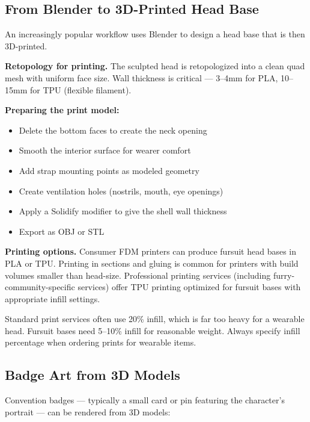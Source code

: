 \subsection{From Blender to 3D-Printed Head Base}

An increasingly popular workflow uses Blender to design a head base that is then 3D-printed.

\textbf{Retopology for printing.} The sculpted head is retopologized into a clean quad mesh with uniform face size. Wall thickness is critical --- 3--4mm for PLA, 10--15mm for TPU (flexible filament).

\textbf{Preparing the print model:}

\begin{itemize}[leftmargin=2em]
  \item Delete the bottom faces to create the neck opening
  \item Smooth the interior surface for wearer comfort
  \item Add strap mounting points as modeled geometry
  \item Create ventilation holes (nostrils, mouth, eye openings)
  \item Apply a Solidify modifier to give the shell wall thickness
  \item Export as OBJ or STL
\end{itemize}

\textbf{Printing options.} Consumer FDM printers can produce fursuit head bases in PLA or TPU. Printing in sections and gluing is common for printers with build volumes smaller than head-size. Professional printing services (including furry-community-specific services) offer TPU printing optimized for fursuit bases with appropriate infill settings.

\begin{warningbox}
Standard print services often use 20\% infill, which is far too heavy for a wearable head. Fursuit bases need 5--10\% infill for reasonable weight. Always specify infill percentage when ordering prints for wearable items.
\end{warningbox}


\subsection{Badge Art from 3D Models}

Convention badges --- typically a small card or pin featuring the character's portrait --- can be rendered from 3D models:

